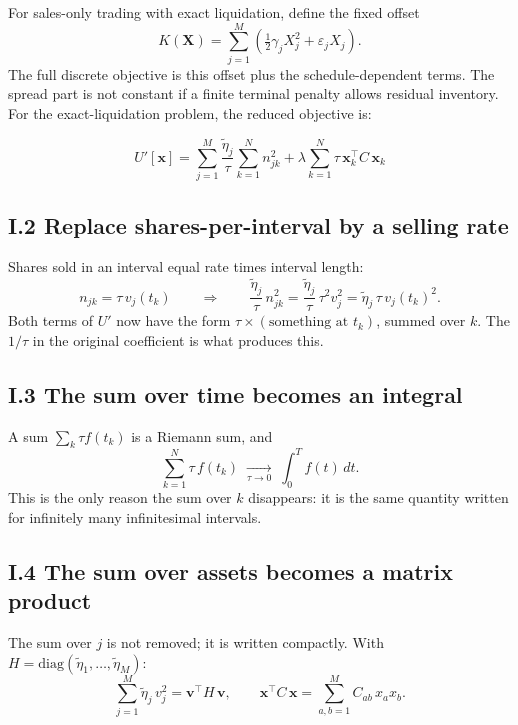 \documentclass[11pt,a4paper]{article}
\begin{document}
For sales-only trading with exact liquidation, define the fixed offset
\[
  K(\mathbf X)=\sum_{j=1}^{M}\left(\tfrac12\gamma_jX_j^2+\varepsilon_jX_j\right).
\]
The full discrete objective is this offset plus the schedule-dependent terms.
The spread part is not constant if a finite terminal penalty allows residual
inventory. For the exact-liquidation problem, the reduced objective is:

\begin{equation}
  U'[\mathbf{x}] = \sum_{j=1}^{M}\frac{\tilde{\eta}_j}{\tau}\sum_{k=1}^{N} n_{jk}^2
  + \lambda \sum_{k=1}^{N} \tau\,\mathbf{x}_k^\top C\,\mathbf{x}_k
\end{equation}

\subsection*{I.2 Replace shares-per-interval by a selling rate}

Shares sold in an interval equal rate times interval length:
\begin{equation}
  n_{jk}=\tau\,v_j(t_k)
  \qquad\Longrightarrow\qquad
  \frac{\tilde\eta_j}{\tau}\,n_{jk}^2=\frac{\tilde\eta_j}{\tau}\,\tau^2 v_j^2
  =\tilde\eta_j\,\tau\,v_j(t_k)^2 .
\end{equation}
Both terms of $U'$ now have the form $\tau\times(\text{something at }t_k)$,
summed over $k$. The $1/\tau$ in the original coefficient is what produces this.

\subsection*{I.3 The sum over time becomes an integral}

A sum $\sum_k \tau f(t_k)$ is a Riemann sum, and
\begin{equation}
  \sum_{k=1}^{N}\tau\,f(t_k)\;\xrightarrow[\tau\to0]{}\;\int_0^T f(t)\,dt .
\end{equation}
This is the only reason the sum over $k$ disappears: it is the same quantity
written for infinitely many infinitesimal intervals.

\subsection*{I.4 The sum over assets becomes a matrix product}

The sum over $j$ is not removed; it is written compactly. With
$H=\mathrm{diag}(\tilde\eta_1,\dots,\tilde\eta_M)$:
\begin{equation}
  \sum_{j=1}^{M}\tilde\eta_j\,v_j^2=\mathbf{v}^\top H\,\mathbf{v},
  \qquad
  \mathbf{x}^\top C\,\mathbf{x}=\sum_{a,b=1}^{M}C_{ab}\,x_a x_b .
\end{equation}
\end{document}
